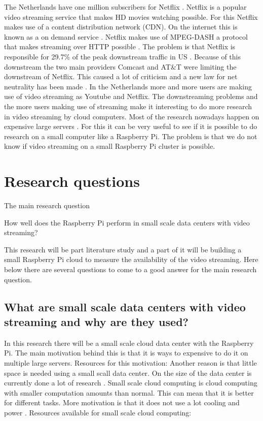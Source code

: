\documentclass{sig-alternate-br}
\begin{document}
The Netherlands have one million subscribers for Netflix \cite{volkskrant}. Netflix is a popular video streaming service that makes HD movies watching possible. For this Netflix makes use of a content distribution network (CDN). On the internet this is known as a on demand service \cite{Adhikari:2012}. Netflix makes use of MPEG-DASH a protocol that makes streaming over HTTP possible \cite{martin:2013}. The problem is that Netflix is responsible for  29.7\% of the peak downstream traffic in US \cite{Adhikari:2012}. Because of this downstream the two main providers Comcast and  AT\&T were limiting the downstream of Netflix. This caused a lot of criticism and a new law for net neutrality has been made \cite{net-neutrality}. \newline
In the Netherlands more and more users are making use of video streaming as Youtube and Netflix. The downstreaming problems and the more users making use of streaming make it interesting to do more research in video streaming by cloud computers. Most of the research nowadays happen on expensive large servers \cite{tso:2013}. For this it can be very useful to see if it is possible to do research on a small computer like a Raspberry Pi. The problem is that we do not know if video streaming on a small Raspberry Pi cluster is possible. 

\section{Research questions}
The main research question
\begin{center} 
How well does the Raspberry Pi perform in small scale data centers with video streaming? 
\end{center}
This research will be part literature study and a part of it will be building a small Raspberry Pi cloud to measure the availability of the video streaming. Here below there are several questions to come to a good answer for the main research question. 

\subsection{What are small scale data centers with video streaming and why are they used?}
In this research there will be a small scale cloud data center with the Raspberry Pi. The main motivation behind this is that it is ways to expensive to do it on multiple large servers. Resources for this motivation:
\cite{southampton, Powerusage, cox:2014} \newline
Another reason is that little space is needed using a small scall data center. On the size of the data center is currently done a lot of research \cite{Pcextreme}. \newline
Small scale cloud computing is cloud computing with smaller computation amounts than normal. This can mean that it is better for different tasks. More motivation is that it does not use a lot cooling and power \cite{tso:2013}. Resources available for small scale cloud computing:
\cite{Pcextreme,armbrust:2009,richardson:2012,abrahamsson:2013,southampton, tso:2013, beloglazov:2010, qian:2009, hofer:2011, drago2012inside, dropbox, owncloud, Miettinen:2010:EEM:1863103.1863107, beloglazov2012energy,cox:2014} 
 
\end{document}
